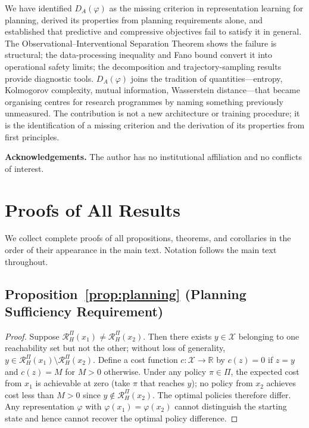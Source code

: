 \documentclass[10pt,twocolumn]{article}
\theoremstyle{plain}
\theoremstyle{definition}
\theoremstyle{remark}
\newcommand{\RHP}{\mathcal{R}_{H}^{\Pi}}
\newcommand{\DA}{D_{A}(\varphi)}
\newcommand{\calX}{\mathcal{X}}
\begin{document}
We have identified $\DA$ as the missing criterion in representation learning for
planning, derived its properties from planning requirements alone, and established
that predictive and compressive objectives fail to satisfy it in general. The
Observational--Interventional Separation Theorem shows the failure is structural;
the data-processing inequality and Fano bound convert it into operational safety
limits; the decomposition and trajectory-sampling results provide diagnostic
tools. $\DA$ joins the tradition of quantities---entropy, Kolmogorov complexity,
mutual information, Wasserstein distance---that became organising centres for
research programmes by naming something previously unmeasured. The contribution
is not a new architecture or training procedure; it is the identification of a
missing criterion and the derivation of its properties from first principles.

\bigskip
\noindent\textbf{Acknowledgements.} The author has no institutional affiliation
and no conflicts of interest.


\appendix
\renewcommand{\thesection}{\Alph{section}}
\titleformat{\section}{\normalsize\bfseries}{Appendix~\thesection.}{0.5em}{}

\section{Proofs of All Results}
\label{app:proofs}

We collect complete proofs of all propositions, theorems, and corollaries in the
order of their appearance in the main text. Notation follows the main text
throughout.

\subsection*{Proposition~\ref{prop:planning} (Planning Sufficiency Requirement)}

\begin{proof}
Suppose $\RHP(x_1)\neq\RHP(x_2)$. Then there exists $y\in\calX$ belonging to
one reachability set but not the other; without loss of generality,
$y\in\RHP(x_1)\setminus\RHP(x_2)$. Define a cost function $c:\calX\to\mathbb{R}$
by $c(z)=0$ if $z=y$ and $c(z)=M$ for $M>0$ otherwise. Under any policy
$\pi\in\Pi$, the expected cost from $x_1$ is achievable at zero (take $\pi$ that
reaches $y$); no policy from $x_2$ achieves cost less than $M>0$ since $y\notin
\RHP(x_2)$. The optimal policies therefore differ. Any representation
$\varphi$ with $\varphi(x_1)=\varphi(x_2)$ cannot distinguish the starting
state and hence cannot recover the optimal policy difference.
\end{proof}
\end{document}
